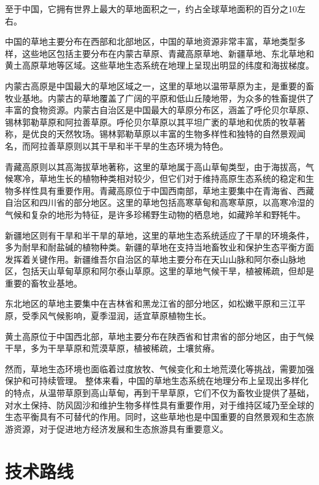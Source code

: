 \documentclass[AutoFakeBold]{LZUThesis-PgD&PhD}
\begin{document}
	至于中国，它拥有世界上最大的草地面积之一，约占全球草地面积的百分之10左右。
	
	中国的草地主要分布在西部和北部地区，中国的草地资源非常丰富，草地类型多样，这些地区包括主要分布在内蒙古草原、青藏高原草地、新疆草地、东北草地和黄土高原草地等区域。这些草地生态系统在地理上呈现出明显的纬度和海拔梯度。
	
	内蒙古高原是中国最大的草地区域之一，这里的草地以温带草原为主，是重要的畜牧业基地。内蒙古的草地覆盖了广阔的平原和低山丘陵地带，为众多的牲畜提供了丰富的食物资源。内蒙古自治区是中国最大的草原分布区，涵盖了呼伦贝尔草原、锡林郭勒草原和阿拉善草原。呼伦贝尔草原以其平坦广袤的草地和优质的牧草著称，是优良的天然牧场。锡林郭勒草原以丰富的生物多样性和独特的自然景观闻名，而阿拉善草原则以其干旱和半干旱的生态环境为特色。
	
	青藏高原则以其高海拔草地著称，这里的草地属于高山草甸类型，由于海拔高，气候寒冷，草地生长的植物种类相对较少，但它们对于维持高原生态系统的稳定和生物多样性具有重要作用。青藏高原位于中国西南部，草地主要集中在青海省、西藏自治区和四川省的部分地区。这里的草地包括高寒草甸和高寒草原，以高寒冷湿的气候和复杂的地形为特征，是许多珍稀野生动物的栖息地，如藏羚羊和野牦牛。
	
	新疆地区则有干旱和半干旱的草地，这里的草地生态系统适应了干旱的环境条件，多为耐旱和耐盐碱的植物种类。新疆的草地在支持当地畜牧业和保护生态平衡方面发挥着关键作用。新疆维吾尔自治区的草地主要分布在天山山脉和阿尔泰山脉地区，包括天山草甸草原和阿尔泰山草原。这里的草地气候干旱，植被稀疏，但却是重要的畜牧业基地。
	
	东北地区的草地主要集中在吉林省和黑龙江省的部分地区，如松嫩平原和三江平原，受季风气候影响，夏季湿润，适宜草原植物生长。
	
	黄土高原位于中国西北部，草地主要分布在陕西省和甘肃省的部分地区，由于气候干旱，多为干旱草原和荒漠草原，植被稀疏，土壤贫瘠。
	
	然而，草地生态环境也面临着过度放牧、气候变化和土地荒漠化等挑战，需要加强保护和可持续管理。 整体来看，中国的草地生态系统在地理分布上呈现出多样化的特点，从温带草原到高山草甸，再到干旱草原，它们不仅为畜牧业提供了基础，对水土保持、防风固沙和维护生物多样性具有重要作用，对于维持区域乃至全球的生态平衡具有不可替代的作用。同时，这些草地也是中国重要的自然景观和生态旅游资源，对于促进地方经济发展和生态旅游具有重要意义。
	


\chapter{技术路线}
\end{document}
